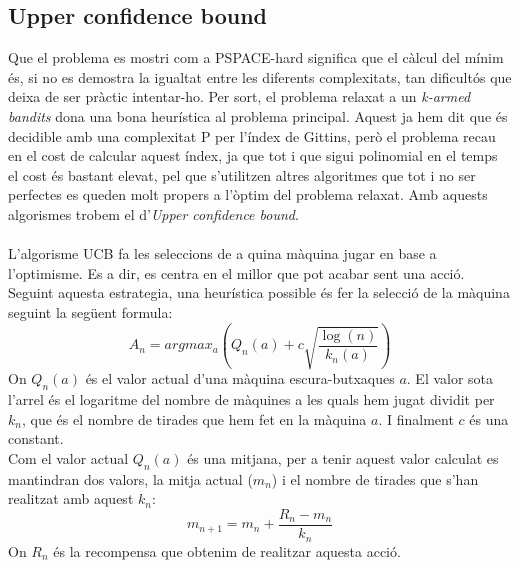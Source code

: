 
	\subsection{Upper confidence bound}
	Que el problema es mostri com a PSPACE-hard significa que el càlcul del mínim és, si no es demostra la igualtat entre
	les diferents complexitats, tan dificultós que deixa de ser pràctic intentar-ho. Per sort, el problema relaxat a un
	\textit{k-armed bandits} dona una bona heurística al problema principal. Aquest ja hem dit que és decidible amb una complexitat P
	 per l'índex de Gittins, però el problema recau en el cost de calcular aquest índex, ja que tot i que sigui polinomial en el temps
	el cost és bastant elevat, pel que s'utilitzen altres algoritmes que tot i no ser perfectes es queden molt propers a l'òptim del 
	problema relaxat. Amb aquests algorismes trobem el d'\textit{Upper confidence bound}. \\
	\\
	L'algorisme UCB fa les seleccions de a quina màquina jugar en base a l'optimisme. Es a dir, es centra en el millor que pot acabar sent una acció.
	Seguint aquesta estrategia, una heurística possible és fer la selecció de la màquina seguint la següent formula:
	\[
	A_n = argmax_a(Q_n(a) + c\sqrt{\frac{\log (n)}{k_n(a)}})
	\]
	On $Q_n(a)$ és el valor actual d'una màquina escura-butxaques $a$. 
	El valor sota l'arrel és el logaritme del nombre de màquines a les quals hem jugat dividit per $k_n$, 
	que és el nombre de tirades que hem fet en la màquina $a$. I finalment $c$ és una constant.\\
	Com el valor actual $Q_n(a)$ és una mitjana, per a tenir aquest valor calculat es mantindran dos valors, la 
	mitja actual ($m_n$) i  el nombre de tirades que s'han realitzat amb aquest $k_n$: %
	\[
	m_{n+1} = m_n + \frac{R_n - m_n}{k_n}
	\]
	On $R_n$ és la recompensa que obtenim de realitzar aquesta acció.
	
	  
